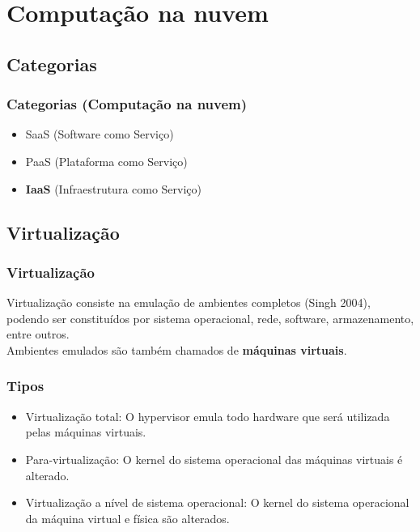 \documentclass{beamer}
\begin{document}
    \section{Computação na nuvem}  
    \subsection{Categorias}    
    \begin{frame}
      \frametitle{Categorias (Computação na nuvem)}
      \begin{itemize}
       \item SaaS (Software como Serviço)
       \item PaaS (Plataforma como Serviço)
       \item \textbf{IaaS} (Infraestrutura como Serviço)
      \end{itemize}
    \end{frame}

    \subsection{Virtualização}
    \begin{frame}
     \frametitle{Virtualização}
     Virtualização consiste na emulação de ambientes completos (Singh 2004), podendo ser constituídos por sistema operacional, rede, software, armazenamento, entre outros.\\
     Ambientes emulados são também chamados de \textbf{máquinas virtuais}.
    \end{frame}

    \begin{frame}
     \frametitle{Tipos}
     \begin{itemize}
      \item Virtualização total: O hypervisor emula todo hardware que será utilizada pelas máquinas virtuais.
      \item Para-virtualização: O kernel do sistema operacional das máquinas virtuais é alterado.
      \item Virtualização a nível de sistema operacional: O kernel do sistema operacional da máquina virtual e física são alterados.
     \end{itemize}
    \end{frame}

\end{document}
